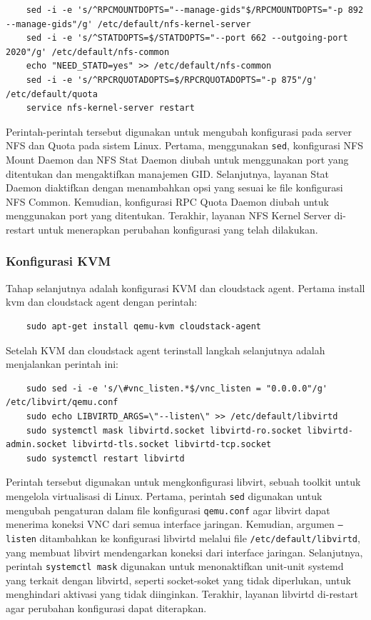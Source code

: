 \begin{lstlisting}
    sed -i -e 's/^RPCMOUNTDOPTS="--manage-gids"$/RPCMOUNTDOPTS="-p 892 --manage-gids"/g' /etc/default/nfs-kernel-server
    sed -i -e 's/^STATDOPTS=$/STATDOPTS="--port 662 --outgoing-port 2020"/g' /etc/default/nfs-common
    echo "NEED_STATD=yes" >> /etc/default/nfs-common
    sed -i -e 's/^RPCRQUOTADOPTS=$/RPCRQUOTADOPTS="-p 875"/g' /etc/default/quota
    service nfs-kernel-server restart
\end{lstlisting}

Perintah-perintah tersebut digunakan untuk mengubah konfigurasi pada server NFS dan Quota pada sistem Linux. Pertama, menggunakan \texttt{sed}, konfigurasi NFS Mount Daemon dan NFS Stat Daemon diubah untuk menggunakan port yang ditentukan dan mengaktifkan manajemen GID. Selanjutnya, layanan Stat Daemon diaktifkan dengan menambahkan opsi yang sesuai ke file konfigurasi NFS Common. Kemudian, konfigurasi RPC Quota Daemon diubah untuk menggunakan port yang ditentukan. Terakhir, layanan NFS Kernel Server di-restart untuk menerapkan perubahan konfigurasi yang telah dilakukan.

\subsubsection{Konfigurasi KVM}
Tahap selanjutnya adalah konfigurasi KVM dan cloudstack agent. Pertama install kvm dan cloudstack agent dengan perintah:

\begin{lstlisting}
    sudo apt-get install qemu-kvm cloudstack-agent
\end{lstlisting}

Setelah KVM dan cloudstack agent terinstall langkah selanjutnya adalah menjalankan perintah ini:

\begin{lstlisting}
    sudo sed -i -e 's/\#vnc_listen.*$/vnc_listen = "0.0.0.0"/g' /etc/libvirt/qemu.conf
    sudo echo LIBVIRTD_ARGS=\"--listen\" >> /etc/default/libvirtd
    sudo systemctl mask libvirtd.socket libvirtd-ro.socket libvirtd-admin.socket libvirtd-tls.socket libvirtd-tcp.socket
    sudo systemctl restart libvirtd
\end{lstlisting}

Perintah tersebut digunakan untuk mengkonfigurasi libvirt, sebuah toolkit untuk mengelola virtualisasi di Linux. Pertama, perintah \texttt{sed} digunakan untuk mengubah pengaturan dalam file konfigurasi \texttt{qemu.conf} agar libvirt dapat menerima koneksi VNC dari semua interface jaringan. Kemudian, argumen \texttt{--listen} ditambahkan ke konfigurasi libvirtd melalui file \texttt{/etc/default/libvirtd}, yang membuat libvirt mendengarkan koneksi dari interface jaringan. Selanjutnya, perintah \texttt{systemctl mask} digunakan untuk menonaktifkan unit-unit systemd yang terkait dengan libvirtd, seperti socket-soket yang tidak diperlukan, untuk menghindari aktivasi yang tidak diinginkan. Terakhir, layanan libvirtd di-restart agar perubahan konfigurasi dapat diterapkan.

